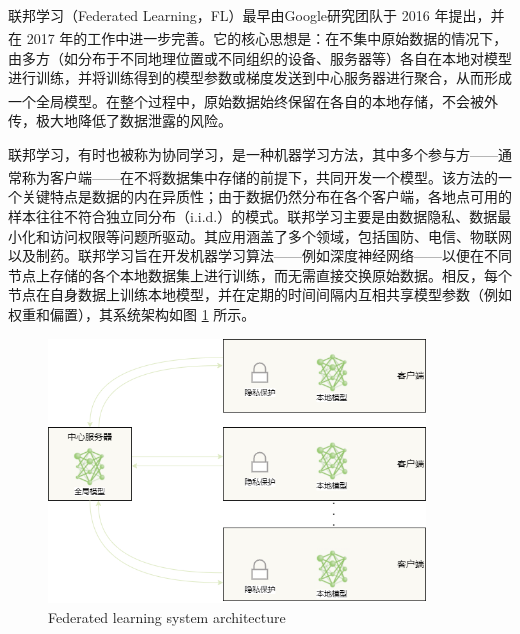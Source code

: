 联邦学习（Federated Learning，FL）最早由Google研究团队于 2016 年提出\textsuperscript{\cite{konevcny2016federated}}，并在 2017 年的工作中进一步完善\textsuperscript{\cite{mcmahan2017communication}}。它的核心思想是：在不集中原始数据的情况下，由多方（如分布于不同地理位置或不同组织的设备、服务器等）各自在本地对模型进行训练，并将训练得到的模型参数或梯度发送到中心服务器进行聚合，从而形成一个全局模型\textsuperscript{\cite{li2020federated}}。在整个过程中，原始数据始终保留在各自的本地存储，不会被外传，极大地降低了数据泄露的风险。

联邦学习，有时也被称为协同学习，是一种机器学习方法，其中多个参与方——通常称为客户端——在不将数据集中存储的前提下，共同开发一个模型\textsuperscript{\cite{kairouz2021advances}}。该方法的一个关键特点是数据的内在异质性；由于数据仍然分布在各个客户端，各地点可用的样本往往不符合独立同分布（i.i.d.）的模式。联邦学习主要是由数据隐私、数据最小化和访问权限等问题所驱动。其应用涵盖了多个领域，包括国防、电信、物联网以及制药。联邦学习旨在开发机器学习算法——例如深度神经网络——以便在不同节点上存储的各个本地数据集上进行训练，而无需直接交换原始数据。相反，每个节点在自身数据上训练本地模型，并在定期的时间间隔内互相共享模型参数（例如权重和偏置），其系统架构如图 \ref{FedArch} 所示。

\begin{figure}[h] %
	\centering %
	\includegraphics[width=10cm]{chapters/imgs/FedArch3} %
	{\wuhao Federated learning system architecture} %
	\label{FedArch} %
\end{figure} %

